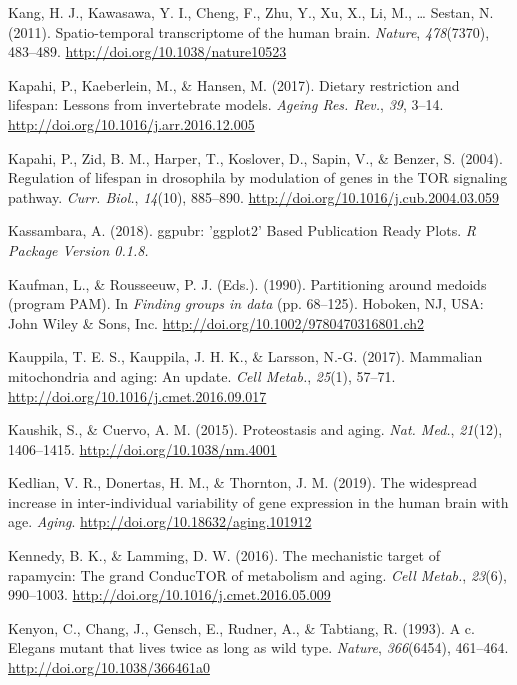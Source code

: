 \documentclass[12pt,twoside]{unicam}
\begin{document}
\begin{cslreferences}
\leavevmode\hypertarget{ref-Kang2011}{}%
Kang, H. J., Kawasawa, Y. I., Cheng, F., Zhu, Y., Xu, X., Li, M., \ldots{} Sestan, N. (2011). Spatio-temporal transcriptome of the human brain. \emph{Nature}, \emph{478}(7370), 483--489. \url{http://doi.org/10.1038/nature10523}

\leavevmode\hypertarget{ref-Kapahi2017}{}%
Kapahi, P., Kaeberlein, M., \& Hansen, M. (2017). Dietary restriction and lifespan: Lessons from invertebrate models. \emph{Ageing Res. Rev.}, \emph{39}, 3--14. \url{http://doi.org/10.1016/j.arr.2016.12.005}

\leavevmode\hypertarget{ref-Kapahi2004}{}%
Kapahi, P., Zid, B. M., Harper, T., Koslover, D., Sapin, V., \& Benzer, S. (2004). Regulation of lifespan in drosophila by modulation of genes in the TOR signaling pathway. \emph{Curr. Biol.}, \emph{14}(10), 885--890. \url{http://doi.org/10.1016/j.cub.2004.03.059}

\leavevmode\hypertarget{ref-Kassambara2018}{}%
Kassambara, A. (2018). ggpubr: 'ggplot2' Based Publication Ready Plots. \emph{R Package Version 0.1.8.}

\leavevmode\hypertarget{ref-Kaufman1990}{}%
Kaufman, L., \& Rousseeuw, P. J. (Eds.). (1990). Partitioning around medoids (program PAM). In \emph{Finding groups in data} (pp. 68--125). Hoboken, NJ, USA: John Wiley \& Sons, Inc. \url{http://doi.org/10.1002/9780470316801.ch2}

\leavevmode\hypertarget{ref-Kauppila2017}{}%
Kauppila, T. E. S., Kauppila, J. H. K., \& Larsson, N.-G. (2017). Mammalian mitochondria and aging: An update. \emph{Cell Metab.}, \emph{25}(1), 57--71. \url{http://doi.org/10.1016/j.cmet.2016.09.017}

\leavevmode\hypertarget{ref-Kaushik2015}{}%
Kaushik, S., \& Cuervo, A. M. (2015). Proteostasis and aging. \emph{Nat. Med.}, \emph{21}(12), 1406--1415. \url{http://doi.org/10.1038/nm.4001}

\leavevmode\hypertarget{ref-Kedlian2019}{}%
Kedlian, V. R., Donertas, H. M., \& Thornton, J. M. (2019). The widespread increase in inter-individual variability of gene expression in the human brain with age. \emph{Aging}. \url{http://doi.org/10.18632/aging.101912}

\leavevmode\hypertarget{ref-Kennedy2016}{}%
Kennedy, B. K., \& Lamming, D. W. (2016). The mechanistic target of rapamycin: The grand ConducTOR of metabolism and aging. \emph{Cell Metab.}, \emph{23}(6), 990--1003. \url{http://doi.org/10.1016/j.cmet.2016.05.009}

\leavevmode\hypertarget{ref-Kenyon1993}{}%
Kenyon, C., Chang, J., Gensch, E., Rudner, A., \& Tabtiang, R. (1993). A c. Elegans mutant that lives twice as long as wild type. \emph{Nature}, \emph{366}(6454), 461--464. \url{http://doi.org/10.1038/366461a0}


\end{cslreferences}
\end{document}
